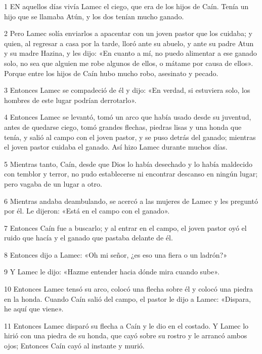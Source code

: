 \par 1 EN aquellos días vivía Lamec el ciego, que era de los hijos de Caín. Tenía un hijo que se llamaba Atún, y los dos tenían mucho ganado.

\par 2 Pero Lamec solía enviarlos a apacentar con un joven pastor que los cuidaba; y quien, al regresar a casa por la tarde, lloró ante su abuelo, y ante su padre Atun y su madre Hazina, y les dijo: «En cuanto a mí, no puedo alimentar a ese ganado solo, no sea que alguien me robe algunos de ellos, o mátame por causa de ellos». Porque entre los hijos de Caín hubo mucho robo, asesinato y pecado.

\par 3 Entonces Lamec se compadeció de él y dijo: «En verdad, si estuviera solo, los hombres de este lugar podrían derrotarlo».

\par 4 Entonces Lamec se levantó, tomó un arco que había usado desde su juventud, antes de quedarse ciego, tomó grandes flechas, piedras lisas y una honda que tenía, y salió al campo con el joven pastor, y se puso detrás del ganado; mientras el joven pastor cuidaba el ganado. Así hizo Lamec durante muchos días.

\par 5 Mientras tanto, Caín, desde que Dios lo había desechado y lo había maldecido con temblor y terror, no pudo establecerse ni encontrar descanso en ningún lugar; pero vagaba de un lugar a otro.

\par 6 Mientras andaba deambulando, se acercó a las mujeres de Lamec y les preguntó por él. Le dijeron: «Está en el campo con el ganado».

\par 7 Entonces Caín fue a buscarlo; y al entrar en el campo, el joven pastor oyó el ruido que hacía y el ganado que pastaba delante de él.

\par 8 Entonces dijo a Lamec: «Oh mi señor, ¿es eso una fiera o un ladrón?»

\par 9 Y Lamec le dijo: «Hazme entender hacia dónde mira cuando sube».

\par 10 Entonces Lamec tensó su arco, colocó una flecha sobre él y colocó una piedra en la honda. Cuando Caín salió del campo, el pastor le dijo a Lamec: «Dispara, he aquí que viene».

\par 11 Entonces Lamec disparó su flecha a Caín y le dio en el costado. Y Lamec lo hirió con una piedra de su honda, que cayó sobre su rostro y le arrancó ambos ojos; Entonces Caín cayó al instante y murió.

